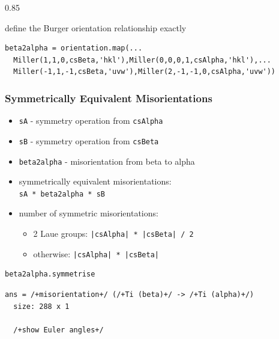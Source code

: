 \documentclass[compress,aspectratio=1610,fleqn]{beamer}
\begin{document}
\begin{frame}[fragile]
\begin{overlayarea}{\textwidth}{0.85\textheight}
\pause
\medskip

define the Burger orientation relationship exactly
\vspace{-0.2cm}
\begin{lstlisting}[style=input]
beta2alpha = orientation.map(...
  Miller(1,1,0,csBeta,'hkl'),Miller(0,0,0,1,csAlpha,'hkl'),...
  Miller(-1,1,-1,csBeta,'uvw'),Miller(2,-1,-1,0,csAlpha,'uvw'))
\end{lstlisting}

\end{overlayarea}
\end{frame}


\begin{frame}[fragile]
  \frametitle{Symmetrically Equivalent Misorientations}

  \begin{itemize}
  \item \texttt{sA} - symmetry operation from \texttt{csAlpha}
  \item \texttt{sB} - symmetry operation from \texttt{csBeta}
  \item \texttt{beta2alpha} - misorientation from beta to alpha
  \item symmetrically equivalent misorientations:\\\texttt{sA * beta2alpha * sB}
  \item number of symmetric  misorientations:
    \begin{itemize}
    \item 2 Laue groups: \texttt{|csAlpha| * |csBeta| / 2}
    \item otherwise: \hspace{0.51cm} \texttt{|csAlpha| * |csBeta|}
    \end{itemize}
  \end{itemize}

\begin{lstlisting}[style=input]
beta2alpha.symmetrise
\end{lstlisting}
\vspace{-0.2cm}
\begin{lstlisting}[style=output]
ans = /+misorientation+/ (/+Ti (beta)+/ -> /+Ti (alpha)+/)
  size: 288 x 1

  /+show Euler angles+/
\end{lstlisting}




\end{frame}
\end{document}
